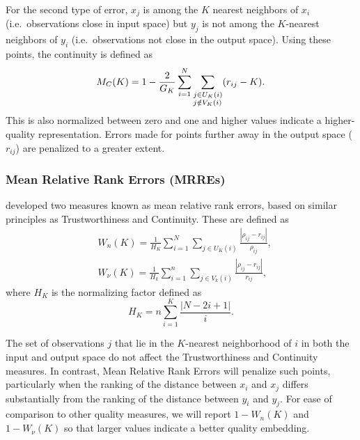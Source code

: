 \documentclass[11pt,a4paper,]{article}
\begin{document}
For the second type of error, \(x_j\) is among the \(K\) nearest neighbors of \(x_i\) (i.e.~observations close in input space) but \(y_j\) is not among the \(K\)-nearest neighbors of \(y_i\) (i.e.~observations not close in the output space). Using these points, the continuity is defined as
\begin{equation}\label{eq:continuity}
  M_{C}(K)=1-\frac{2}{G_{K}} \sum_{i=1}^{N} \sum_{\begin{subarray}{\ell}j \in U_{K}(i) \\j\notin V_{K}(i)\end{subarray}}(r_{ij}-K).
\end{equation}
This is also normalized between zero and one and higher values indicate a higher-quality representation. Errors made for points further away in the output space (\(r_{ij}\)) are penalized to a greater extent.

\hypertarget{mean-relative-rank-errors-mrres}{%
\subsubsection*{Mean Relative Rank Errors (MRREs)}\label{mean-relative-rank-errors-mrres}}

\textcite{Lee2008-dy} developed two measures known as mean relative rank errors, based on similar principles as Trustworthiness and Continuity. These are defined as
\begin{equation}\label{eq:MRREs}
\begin{aligned}
  & W_{n}(K)=\frac{1}{H_{K}} \sum_{i=1}^{N} \sum_{j \in U_{K}(i)} \frac{|\rho_{ij}-r_{ij}|}{\rho_{ij}}, \\
  & W_{\nu}(K)=\frac{1}{H_{k}} \sum_{i=1}^{n} \sum_{j \in V_{k}(i)} \frac{|\rho_{ij}-r_{ij}|}{r_{ij}},
\end{aligned}
\end{equation}
where \(H_K\) is the normalizing factor defined as
\[
  H_{K}=n \sum_{i=1}^{K} \frac{|N-2 i+1|}{i}.
\]

The set of observations \(j\) that lie in the \(K\)-nearest neighborhood of \(i\) in both the input and output space do not affect the Trustworthiness and Continuity measures. In contrast, Mean Relative Rank Errors will penalize such points, particularly when the ranking of the distance between \(x_i\) and \(x_j\) differs substantially from the ranking of the distance between \(y_i\) and \(y_j\). For ease of comparison to other quality measures, we will report \(1-W_{n}(K)\) and \(1-W_{\nu}(K)\) so that larger values indicate a better quality embedding.
\end{document}
